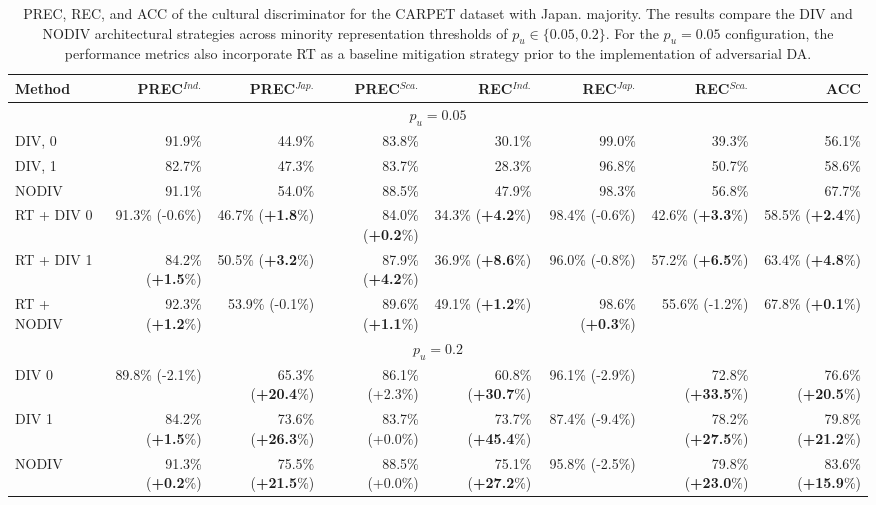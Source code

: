 %
\begin{table}
\centering
\scriptsize
\setlength{\tabcolsep}{0.1cm}
\begin{tabular}{lrrrrrrr}
\toprule
\textbf{Method} & \textbf{PREC}$^{Ind.}$  & \textbf{PREC}$^{Jap.}$ & \textbf{PREC}$^{Sca.}$ & \textbf{REC}$^{Ind.}$ & \textbf{REC}$^{Jap.}$ & \textbf{REC}$^{Sca.}$ &  \textbf{ACC}\\
\midrule
\multicolumn{8}{c}{$p_u=0.05$} \\
\midrule
DIV, 0 & 91.9\%&	44.9\%&	83.8\%&	30.1\%&	99.0\%&	39.3\%	&	56.1\%\\
DIV, 1 & 82.7\%	&	47.3\%&	83.7\%&	28.3\%&	96.8\% &	50.7\% &	58.6\%\\
NODIV & 91.1\%&	54.0\%&	88.5\%&	47.9\%&	98.3\%&	56.8\%	&	67.7\%	\\
\midrule
RT + DIV 0      & 91.3\% (-0.6\%) & 46.7\% (\textbf{+1.8}\%) & 84.0\% (\textbf{+0.2}\%) & 34.3\% (\textbf{+4.2}\%) & 98.4\% (-0.6\%) & 42.6\% (\textbf{+3.3}\%) & 58.5\% (\textbf{+2.4}\%) \\
RT + DIV 1      & 84.2\% (\textbf{+1.5}\%) & 50.5\% (\textbf{+3.2}\%) & 87.9\% (\textbf{+4.2}\%) & 36.9\% (\textbf{+8.6}\%) & 96.0\% (-0.8\%) & 57.2\% (\textbf{+6.5}\%) & 63.4\% (\textbf{+4.8}\%) \\
RT + NODIV      & 92.3\% (\textbf{+1.2}\%) & 53.9\% (-0.1\%) & 89.6\% (\textbf{+1.1}\%) & 49.1\% (\textbf{+1.2}\%) & 98.6\% (\textbf{+0.3}\%) & 55.6\% (-1.2\%) & 67.8\% (\textbf{+0.1}\%) \\
\midrule
\multicolumn{8}{c}{$p_u=0.2$} \\
\midrule
DIV 0           & 89.8\% (-2.1\%) & 65.3\% (\textbf{+20.4}\%) & 86.1\% (+2.3\%) & 60.8\% (\textbf{+30.7}\%) & 96.1\% (-2.9\%) & 72.8\% (\textbf{+33.5}\%) & 76.6\% (\textbf{+20.5}\%) \\
DIV 1           & 84.2\% (\textbf{+1.5}\%) & 73.6\% (\textbf{+26.3}\%) & 83.7\% (+0.0\%) & 73.7\% (\textbf{+45.4}\%) & 87.4\% (-9.4\%) & 78.2\% (\textbf{+27.5}\%) & 79.8\% (\textbf{+21.2}\%) \\
NODIV           & 91.3\% (\textbf{+0.2}\%) & 75.5\% (\textbf{+21.5}\%) & 88.5\% (+0.0\%) & 75.1\% (\textbf{+27.2}\%) & 95.8\% (-2.5\%) & 79.8\% (\textbf{+23.0}\%) & 83.6\% (\textbf{+15.9}\%) \\
\bottomrule
\end{tabular}
\caption{PREC, REC, and ACC of the cultural discriminator for the CARPET dataset with Japan. majority. The results compare the DIV and NODIV architectural strategies across minority representation thresholds of $p_u \in \{0.05, 0.2\}$. For the $p_u = 0.05$ configuration, the performance metrics also incorporate RT as a baseline mitigation strategy prior to the implementation of adversarial DA.}
\label{ch3:tab:discr:CJ}
\end{table}
%

